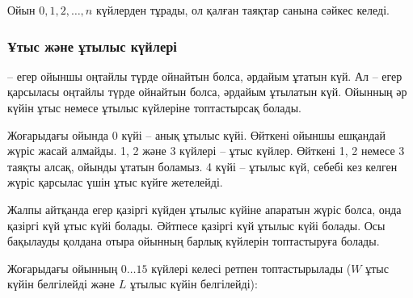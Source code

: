 Ойын $0,1,2,\ldots,n$ күйлерден тұрады, ол 
қалған таяқтар санына сәйкес келеді. 


\subsubsection{Ұтыс және ұтылыс күйлері}


 -- егер ойыншы оңтайлы түрде ойнайтын болса,
әрдайым ұтатын күй. Ал  -- егер қарсыласы 
оңтайлы түрде ойнайтын болса, әрдайым ұтылатын күй. 
Ойынның әр күйін ұтыс немесе ұтылыс күйлеріне топтастырсақ болады.


Жоғарыдағы ойында 0 күйі -- анық ұтылыс күйі. Өйткені ойыншы ешқандай
жүріс жасай алмайды. 1, 2 және 3 күйлері -- ұтыс күйлер. Өйткені
1, 2 немесе 3 таяқты алсақ, ойынды ұтатын боламыз. 
4 күйі -- ұтылыс күй, себебі кез келген жүріс
қарсылас үшін ұтыс күйге жетелейді.


Жалпы айтқанда егер қазіргі күйден ұтылыс күйіне апаратын
жүріс болса, онда қазіргі күй ұтыс күйі болады. Әйтпесе қазіргі 
күй ұтылыс күйі болады. Осы бақылауды қолдана отыра ойынның 
барлық күйлерін топтастыруға болады. 


Жоғарыдағы ойынның $0 \ldots 15$ күйлері келесі ретпен топтастырылады
($W$ ұтыс күйін белгілейді және $L$ ұтылыс күйін белгілейді):

